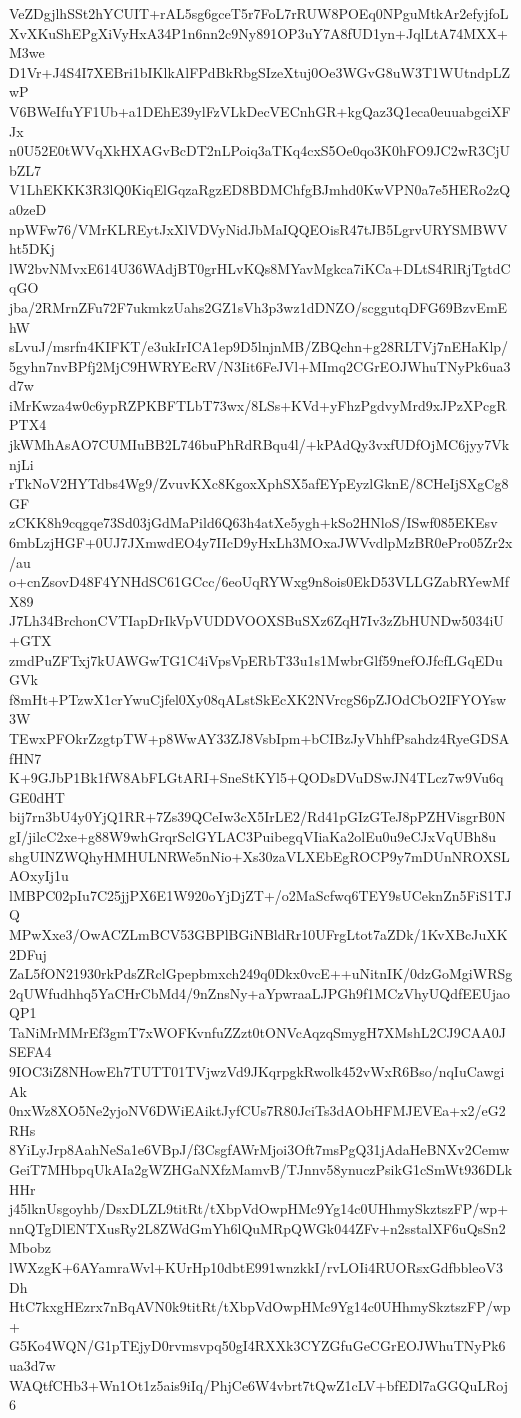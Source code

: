 VeZDgjlhSSt2hYCUIT+rAL5sg6gceT5r7FoL7rRUW8POEq0NPguMtkAr2efyjfoL
XvXKuShEPgXiVyHxA34P1n6nn2c9Ny891OP3uY7A8fUD1yn+JqlLtA74MXX+M3we
D1Vr+J4S4I7XEBri1bIKlkAlFPdBkRbgSIzeXtuj0Oe3WGvG8uW3T1WUtndpLZwP
V6BWeIfuYF1Ub+a1DEhE39ylFzVLkDecVECnhGR+kgQaz3Q1eca0euuabgciXFJx
n0U52E0tWVqXkHXAGvBcDT2nLPoiq3aTKq4cxS5Oe0qo3K0hFO9JC2wR3CjUbZL7
V1LhEKKK3R3lQ0KiqElGqzaRgzED8BDMChfgBJmhd0KwVPN0a7e5HERo2zQa0zeD
npWFw76/VMrKLREytJxXlVDVyNidJbMaIQQEOisR47tJB5LgrvURYSMBWVht5DKj
lW2bvNMvxE614U36WAdjBT0grHLvKQs8MYavMgkca7iKCa+DLtS4RlRjTgtdCqGO
jba/2RMrnZFu72F7ukmkzUahs2GZ1sVh3p3wz1dDNZO/scggutqDFG69BzvEmEhW
sLvuJ/msrfn4KIFKT/e3ukIrICA1ep9D5lnjnMB/ZBQchn+g28RLTVj7nEHaKlp/
5gyhn7nvBPfj2MjC9HWRYEcRV/N3Iit6FeJVl+MImq2CGrEOJWhuTNyPk6ua3d7w
iMrKwza4w0c6ypRZPKBFTLbT73wx/8LSs+KVd+yFhzPgdvyMrd9xJPzXPcgRPTX4
jkWMhAsAO7CUMIuBB2L746buPhRdRBqu4l/+kPAdQy3vxfUDfOjMC6jyy7VknjLi
rTkNoV2HYTdbs4Wg9/ZvuvKXc8KgoxXphSX5afEYpEyzlGknE/8CHeIjSXgCg8GF
zCKK8h9cqgqe73Sd03jGdMaPild6Q63h4atXe5ygh+kSo2HNloS/ISwf085EKEsv
6mbLzjHGF+0UJ7JXmwdEO4y7IIcD9yHxLh3MOxaJWVvdlpMzBR0ePro05Zr2x/au
o+cnZsovD48F4YNHdSC61GCcc/6eoUqRYWxg9n8ois0EkD53VLLGZabRYewMfX89
J7Lh34BrchonCVTIapDrIkVpVUDDVOOXSBuSXz6ZqH7Iv3zZbHUNDw5034iU+GTX
zmdPuZFTxj7kUAWGwTG1C4iVpsVpERbT33u1s1MwbrGlf59nefOJfcfLGqEDuGVk
f8mHt+PTzwX1crYwuCjfel0Xy08qALstSkEcXK2NVrcgS6pZJOdCbO2IFYOYsw3W
TEwxPFOkrZzgtpTW+p8WwAY33ZJ8VsbIpm+bCIBzJyVhhfPsahdz4RyeGDSAfHN7
K+9GJbP1Bk1fW8AbFLGtARI+SneStKYl5+QODsDVuDSwJN4TLcz7w9Vu6qGE0dHT
bij7rn3bU4y0YjQ1RR+7Zs39QCeIw3cX5IrLE2/Rd41pGIzGTeJ8pPZHVisgrB0N
gI/jilcC2xe+g88W9whGrqrSclGYLAC3PuibegqVIiaKa2olEu0u9eCJxVqUBh8u
shgUINZWQhyHMHULNRWe5nNio+Xs30zaVLXEbEgROCP9y7mDUnNROXSLAOxyIj1u
lMBPC02pIu7C25jjPX6E1W920oYjDjZT+/o2MaScfwq6TEY9sUCeknZn5FiS1TJQ
MPwXxe3/OwACZLmBCV53GBPlBGiNBldRr10UFrgLtot7aZDk/1KvXBcJuXK2DFuj
ZaL5fON21930rkPdsZRclGpepbmxch249q0Dkx0vcE++uNitnIK/0dzGoMgiWRSg
2qUWfudhhq5YaCHrCbMd4/9nZnsNy+aYpwraaLJPGh9f1MCzVhyUQdfEEUjaoQP1
TaNiMrMMrEf3gmT7xWOFKvnfuZZzt0tONVcAqzqSmygH7XMshL2CJ9CAA0JSEFA4
9IOC3iZ8NHowEh7TUTT01TVjwzVd9JKqrpgkRwolk452vWxR6Bso/nqIuCawgiAk
0nxWz8XO5Ne2yjoNV6DWiEAiktJyfCUs7R80JciTs3dAObHFMJEVEa+x2/eG2RHs
8YiLyJrp8AahNeSa1e6VBpJ/f3CsgfAWrMjoi3Oft7msPgQ31jAdaHeBNXv2Cemw
GeiT7MHbpqUkAIa2gWZHGaNXfzMamvB/TJnnv58ynuczPsikG1cSmWt936DLkHHr
j45lknUsgoyhb/DsxDLZL9titRt/tXbpVdOwpHMc9Yg14c0UHhmySkztszFP/wp+
nnQTgDlENTXusRy2L8ZWdGmYh6lQuMRpQWGk044ZFv+n2sstalXF6uQsSn2Mbobz
lWXzgK+6AYamraWvl+KUrHp10dbtE991wnzkkI/rvLOIi4RUORsxGdfbbleoV3Dh
HtC7kxgHEzrx7nBqAVN0k9titRt/tXbpVdOwpHMc9Yg14c0UHhmySkztszFP/wp+
G5Ko4WQN/G1pTEjyD0rvmsvpq50gI4RXXk3CYZGfuGeCGrEOJWhuTNyPk6ua3d7w
WAQtfCHb3+Wn1Ot1z5ais9iIq/PhjCe6W4vbrt7tQwZ1cLV+bfEDl7aGGQuLRoj6
